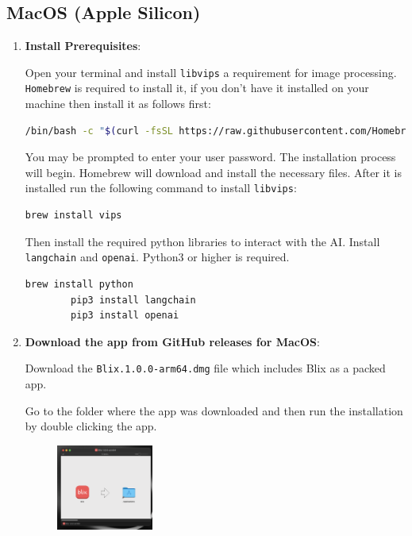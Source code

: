 \documentclass[11pt,a4paper]{article}
\def\code#1{\texttt{#1}}
\begin{document}
\subsection*{MacOS (Apple Silicon)}


\begin{enumerate}[label*=\arabic*.]
	\item[\textbullet] {\bf Install Prerequisites}: 

	Open your terminal and install \code{libvips} a requirement for image
	processing. \code{Homebrew} is required to install it, if you don't have it
	installed on your machine then install it as follows first:

	\begin{lstlisting}[language=sh]
		 /bin/bash -c "$(curl -fsSL https://raw.githubusercontent.com/Homebrew/install/HEAD/install.sh)"
	\end{lstlisting}

	You may be prompted to enter your user password. The installation process
	will begin. Homebrew will download and install the necessary files. After it
	is installed run the following command to install \code{libvips}:

	\begin{lstlisting}[language=sh]
		brew install vips
	\end{lstlisting}

	Then install the required python libraries to interact with the AI. Install
	\code{langchain} and \code{openai}. Python3 or higher is required.

	\begin{lstlisting}[language=sh]
		brew install python
		pip3 install langchain
		pip3 install openai
	\end{lstlisting}

	\item[\textbullet] {\bf Download the app from GitHub releases for MacOS}: 

	Download the \code{Blix.1.0.0-arm64.dmg} file which includes Blix as a packed app.

	Go to the folder where the app was downloaded and then run the installation
	by double clicking the app.

	\begin{figure}[ht]
		\centering
		\includegraphics[width=0.3\textwidth,height=\textheight,keepaspectratio,rotate=0,origin=c]{../pics/mac-isntall.png}
	\end{figure}
\end{enumerate}
\end{document}
